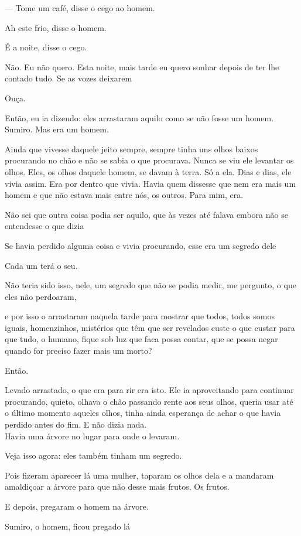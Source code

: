 --- Tome um café, disse o cego ao homem.

Ah este frio, disse o homem.

É a noite, disse o cego.

Não. Eu não quero. Esta noite, mais tarde eu quero sonhar depois de ter
lhe contado tudo. Se as vozes deixarem

Ouça.

Então, eu ia dizendo: eles arrastaram aquilo como se não fosse um homem.
Sumiro. Mas era um homem.

Ainda que vivesse daquele jeito sempre, sempre tinha uns olhos baixos
procurando no chão e não se sabia o que procurava. Nunca se viu ele
levantar os olhos. Eles, os olhos daquele homem, se davam à terra. Só a
ela. Dias e dias, ele vivia assim. Era por dentro que vivia. Havia quem
dissesse que nem era mais um homem e que não estava mais entre nós, os
outros. Para mim, era.

Não sei que outra coisa podia ser aquilo, que às vezes até falava embora
não se entendesse o que dizia

Se havia perdido alguma coisa e vivia procurando, esse era um segredo
dele

Cada um terá o seu.

Não teria sido isso, nele, um segredo que não se podia medir, me
pergunto, o que eles não perdoaram,

e por isso o arrastaram naquela tarde para mostrar que todos, todos
somos iguais, homenzinhos, mistérios que têm que ser revelados custe o
que custar para que tudo, o humano, fique sob luz que faca possa contar,
que se possa negar quando for preciso fazer mais um morto?

Então.

Levado arrastado, o que era para rir era isto. Ele ia aproveitando para
continuar procurando, quieto, olhava o chão passando rente aos seus
olhos, queria usar até o último momento aqueles olhos, tinha ainda
esperança de achar o que havia perdido antes do fim. E não dizia nada.\\

Havia uma árvore no lugar para onde o levaram.

Veja isso agora: eles também tinham um segredo.

Pois fizeram aparecer lá uma mulher, taparam os olhos dela e a mandaram
amaldiçoar a árvore para que não desse mais frutos. Os frutos.

E depois, pregaram o homem na árvore.

Sumiro, o homem, ficou pregado lá

